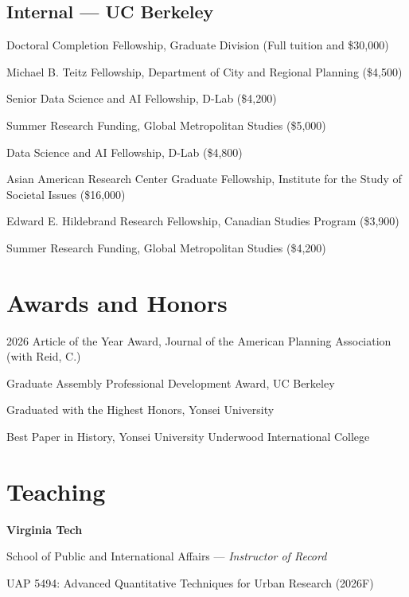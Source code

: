 \documentclass[11pt,letterpaper]{article}
\newcommand{\spitem}{\Needspace{2.6\baselineskip}\item} %
\newcommand{\money}[1]{(\$#1)}
\newcommand{\term}[1]{(#1)}
\begin{document}
\subsection{Internal --- UC Berkeley}
\begin{tablist}
  \item[2025] \tab{}Doctoral Completion Fellowship, Graduate Division \term{Full tuition and \$30,000}
  \item[2025] \tab{}Michael B. Teitz Fellowship, Department of City and Regional Planning \money{4,500}
  \item[2025] \tab{}Senior Data Science and AI Fellowship, D-Lab \money{4,200}
  \item[2025] \tab{}Summer Research Funding, Global Metropolitan Studies \money{5,000}
  \item[2024] \tab{}Data Science and AI Fellowship, D-Lab \money{4,800}
  \item[2024--26] \tab{}Asian American Research Center Graduate Fellowship, Institute for the Study of Societal Issues \money{16,000}
  \item[2022] \tab{}Edward E. Hildebrand Research Fellowship, Canadian Studies Program \money{3,900}
  \item[2022] \tab{}Summer Research Funding, Global Metropolitan Studies \money{4,200}
\end{tablist}

\section{Awards and Honors}
\begin{tablist}
  \item[2026] \tab{}2026 Article of the Year Award, Journal of the American Planning Association (with Reid, C.)
  \item[2022] \tab{}Graduate Assembly Professional Development Award, UC Berkeley
  \item[2017] \tab{}Graduated with the Highest Honors, Yonsei University
  \item[2017] \tab{}Best Paper in History, Yonsei University Underwood International College
\end{tablist}

\section{Teaching}

\noindent\textbf{Virginia Tech}\par\vspace{.10\baselineskip}
\begin{subpoints}
  \spitem School of Public and International Affairs --- \textit{Instructor of Record}
    \begin{subpoints2}
      \spitem UAP 5494: Advanced Quantitative Techniques for Urban Research \term{2026F}
    \end{subpoints2}
\end{subpoints}
\end{document}

